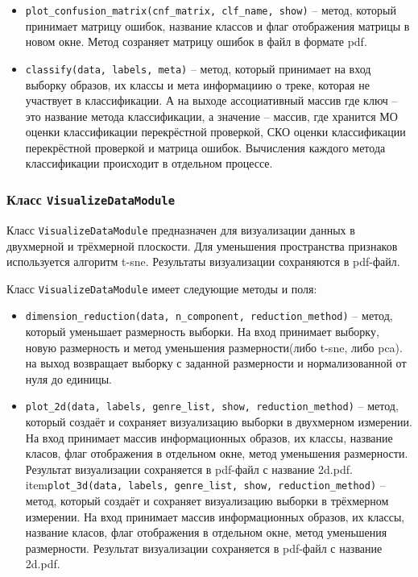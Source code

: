 \begin{itemize}
\item{\texttt{plot\_confusion\_matrix(cnf\_matrix, clf\_name, show)} -- метод, который принимает матрицу ошибок, название классов и флаг отображения матрицы в новом окне.
Метод созраняет матрицу ошибок в файл в формате pdf. }
\item{\texttt{classify(data, labels, meta)} -- метод, который принимает на вход выборку образов, их классы и мета информациию о треке, которая не участвует в классификации. А на выходе ассоциативный массив где ключ -- это название метода классификации, а значение -- массив, где хранится МО оценки классификации перекрёстной проверкой, СКО оценки классификации перекрёстной проверкой и матрица ошибок. Вычисления каждого метода классификации происходит в отдельном процессе.}
\end{itemize}

\subsubsection{Класс \texttt{VisualizeDataModule}}

Класс \texttt{VisualizeDataModule} предназначен для визуализации данных в двухмерной и трёхмерной плоскости. Для уменьшения пространства признаков используется алгоритм t-sne. Результаты визуализации сохраняются в pdf-файл. 

Класс \texttt{VisualizeDataModule} имеет следующие методы и поля:

\begin{itemize}
\item{\texttt{dimension\_reduction(data, n\_component, reduction\_method)} -- метод, который уменьшает размерность выборки. На вход принимает выборку, новую размерность и метод уменьшения размерности(либо t-sne, либо pca). на выход возвращает выборку с заданной размерности и нормализованной от нуля до единицы.}
\item{\texttt{plot\_2d(data, labels, genre\_list, show, reduction\_method)} -- метод, который создаёт и сохраняет визуализацию выборки в двухмерном измерении. На вход принимает массив информационных образов, их классы, название класов, флаг отображения в отдельном окне, метод уменьшения размерности. Результат визуализации сохраняется в pdf-файл с название 2d.pdf.}
item{\texttt{plot\_3d(data, labels, genre\_list, show, reduction\_method)} -- метод, который создаёт и сохраняет визуализацию выборки в трёхмерном измерении. На вход принимает массив информационных образов, их классы, название класов, флаг отображения в отдельном окне, метод уменьшения размерности. Результат визуализации сохраняется в pdf-файл с название 2d.pdf.}
\end{itemize}

